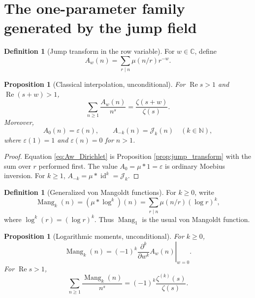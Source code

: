 \documentclass[11pt]{amsart}
\numberwithin{equation}{section}
\theoremstyle{plain}
\newtheorem{proposition}[theorem]{Proposition}
\theoremstyle{definition}
\newtheorem{definition}[theorem]{Definition}
\theoremstyle{remark}
\newcommand{\N}{\mathbb N}
\newcommand{\C}{\mathbb C}
\newcommand{\epsfun}{\varepsilon}
\newcommand{\mob}{\mu}
\newcommand{\zetaR}{\zeta}
\newcommand{\Jordan}{\mathcal J}
\newcommand{\Mang}{\operatorname{Mang}}
\begin{document}
\section{The one-parameter family generated by the jump field}
\label{sec:Aw_family}

\begin{definition}[Jump transform in the row variable]
\label{def:Aw}
For \(w\in\C\), define
\begin{equation}
A_w(n)=\sum_{r\mid n}\mob(n/r)r^{-w}.
\label{eq:Aw_def}
\end{equation}
\end{definition}

\begin{proposition}[Classical interpolation, unconditional]
\label{prop:Aw_properties}
For \(\operatorname{Re}s>1\) and \(\operatorname{Re}(s+w)>1\),
\begin{equation}
\sum_{n\ge1}\frac{A_w(n)}{n^s}=\frac{\zetaR(s+w)}{\zetaR(s)}.
\label{eq:Aw_Dirichlet}
\end{equation}
Moreover,
\begin{equation}
A_0(n)=\epsfun(n),
\qquad
A_{-k}(n)=\Jordan_k(n)
\quad(k\in\N),
\label{eq:Aw_special_values}
\end{equation}
where \(\epsfun(1)=1\) and \(\epsfun(n)=0\) for \(n>1\).
\end{proposition}

\begin{proof}
Equation \eqref{eq:Aw_Dirichlet} is Proposition \ref{prop:jump_transform} with the sum over \(r\) performed first.  The value \(A_0=\mob*1=\epsfun\) is ordinary Moebius inversion.  For \(k\ge1\), \(A_{-k}=\mob*\operatorname{id}^k=\Jordan_k\).
\end{proof}

\begin{definition}[Generalized von Mangoldt functions]
\label{def:Mang_k}
For \(k\ge0\), write
\begin{equation}
\Mang_k(n)=(\mob*\log^k)(n)=\sum_{r\mid n}\mob(n/r)(\log r)^k,
\label{eq:Mang_k_def}
\end{equation}
where \(\log^k(r)=(\log r)^k\).  Thus \(\Mang_1\) is the usual von Mangoldt function.
\end{definition}

\begin{proposition}[Logarithmic moments, unconditional]
\label{prop:log_moments}
For \(k\ge0\),
\begin{equation}
\Mang_k(n)=(-1)^k\left.\frac{\partial^k}{\partial w^k}A_w(n)\right|_{w=0}.
\label{eq:Mang_from_Aw}
\end{equation}
For \(\operatorname{Re}s>1\),
\begin{equation}
\sum_{n\ge1}\frac{\Mang_k(n)}{n^s}=(-1)^k\frac{\zetaR^{(k)}(s)}{\zetaR(s)}.
\label{eq:Mang_Dirichlet}
\end{equation}
\end{proposition}
\end{document}
